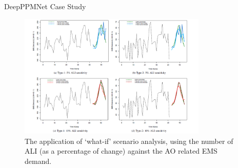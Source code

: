\documentclass{beamer}
\begin{document}
\begin{frame}{DeepPPMNet Case Study}
\begin{figure}[htbp]
\centerline{\includegraphics[width=0.80\textwidth]{images/whatif}}
\caption{ \scriptsize The application of `what-if' scenario analysis, using the number of  ALI (as a percentage of change) against the AO related EMS demand.}
\label{whatif}
\end{figure}
\end{frame}

  
\end{document}
